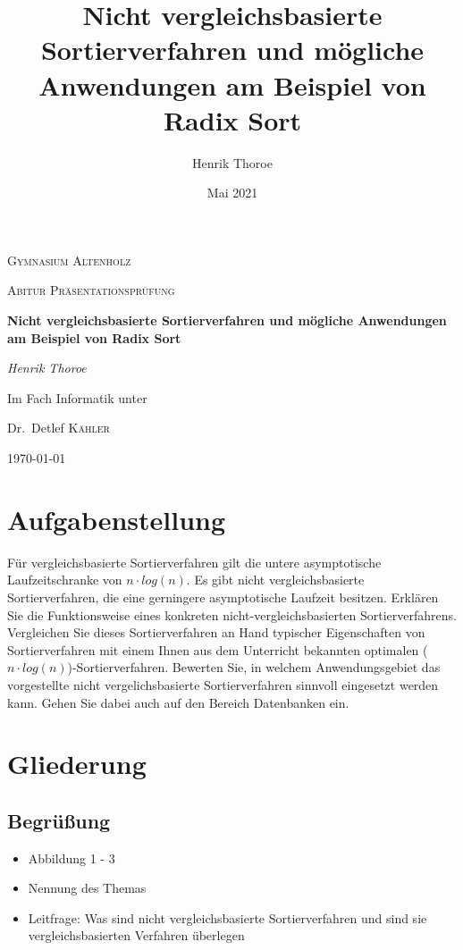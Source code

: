 \documentclass[a4paper, 12pt, oneside]{article}
\title{\bfseries Nicht vergleichsbasierte Sortierverfahren und mögliche Anwendungen am Beispiel von Radix Sort}
\author{Henrik Thoroe}
\date{Mai 2021}
\begin{document}
    \begin{titlepage}
        \centering
        {\scshape\LARGE Gymnasium Altenholz \par}
        \vspace{1cm}
        {\scshape\Large Abitur Präsentationsprüfung\par}
        \vspace{1.5cm}
        {\huge\bfseries Nicht vergleichsbasierte Sortierverfahren und mögliche Anwendungen am Beispiel von Radix Sort\par}
        \vspace{2cm}
        {\Large\itshape Henrik Thoroe\par}
        \vfill
        Im Fach Informatik unter\par
        Dr.~Detlef \textsc{Kähler}

        \vfill

        {\large \today\par}
    \end{titlepage}


    \section{Aufgabenstellung}

    Für vergleichsbasierte Sortierverfahren gilt die untere asymptotische Laufzeitschranke von $n \cdot log(n)$.
    Es gibt nicht vergleichsbasierte Sortierverfahren, die eine gerningere asymptotische Laufzeit besitzen.
    Erklären Sie die Funktionsweise eines konkreten nicht-vergleichsbasierten Sortierverfahrens.
    Vergleichen Sie dieses Sortierverfahren an Hand typischer Eigenschaften von Sortierverfahren mit
    einem Ihnen aus dem Unterricht bekannten optimalen ($n \cdot log(n)$)-Sortierverfahren.
    Bewerten Sie, in welchem Anwendungsgebiet das vorgestellte nicht vergelichsbasierte Sortierverfahren
    sinnvoll eingesetzt werden kann. Gehen Sie dabei auch auf den Bereich Datenbanken ein.


    \section{Gliederung}

    \subsection{Begrüßung}

    \begin{itemize}
        \item Abbildung 1 - 3
        \item Nennung des Themas
        \item Leitfrage: Was sind nicht vergleichsbasierte Sortierverfahren und sind sie vergleichsbasierten Verfahren überlegen
    \end{itemize}
\end{document}
